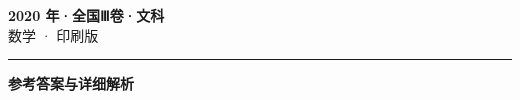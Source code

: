 \documentclass[zihao=5, a4paper]{ctexart}
\begin{document}
\begin{center}
  {\Large\bfseries 2020 年·全国Ⅲ卷·文科}\\[4pt]
  {\large 数学 · 印刷版}
\end{center}
\medskip
{}

\par\bigskip\hrule\bigskip
{}
\Needspace{0.55\textheight}
\begin{center}{\large\bfseries 参考答案与详细解析}\end{center}
\smallskip

\end{document}
